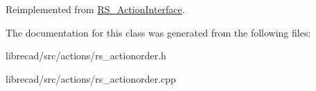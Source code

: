 Reimplemented from \hyperlink{classRS__ActionInterface_af1a8d898a8bf0521295d7c45d80e6d09}{R\-S\-\_\-\-Action\-Interface}.



The documentation for this class was generated from the following files\-:\begin{DoxyCompactItemize}
\item 
librecad/src/actions/rs\-\_\-actionorder.\-h\item 
librecad/src/actions/rs\-\_\-actionorder.\-cpp\end{DoxyCompactItemize}

